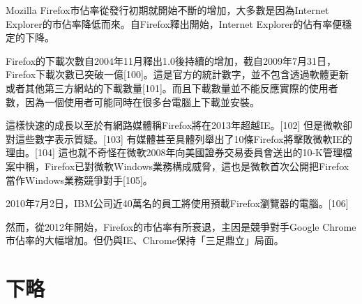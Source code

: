 \documentclass[12pt]{article}
\begin{document}
Mozilla Firefox市佔率從發行初期就開始不斷的增加，大多數是因為Internet Explorer的市佔率降低而來。自Firefox釋出開始，Internet Explorer的佔有率便穩定的下降。

Firefox的下載次數自2004年11月釋出1.0後持續的增加，截自2009年7月31日，Firefox下載次數已突破一億[100]。這是官方的統計數字，並不包含透過軟體更新或者其他第三方網站的下載數量[101]。而且下載數量並不能反應實際的使用者數，因為一個使用者可能同時在很多台電腦上下載並安裝。

這樣快速的成長以至於有網路媒體稱Firefox將在2013年超越IE。[102] 但是微軟卻對這些數字表示質疑。[103] 有媒體甚至具體列舉出了10條Firefox將擊敗微軟IE的理由。[104] 這也就不奇怪在微軟2008年向美國證券交易委員會送出的10-K管理檔案中稱，Firefox已對微軟Windows業務構成威脅，這也是微軟首次公開把Firefox當作Windows業務競爭對手[105]。

2010年7月2日，IBM公司近40萬名的員工將使用預載Firefox瀏覽器的電腦。[106]

然而，從2012年開始，Firefox的市佔率有所衰退，主因是競爭對手Google Chrome市佔率的大幅增加。但仍與IE、Chrome保持「三足鼎立」局面。

\section{下略}
\end{document}
